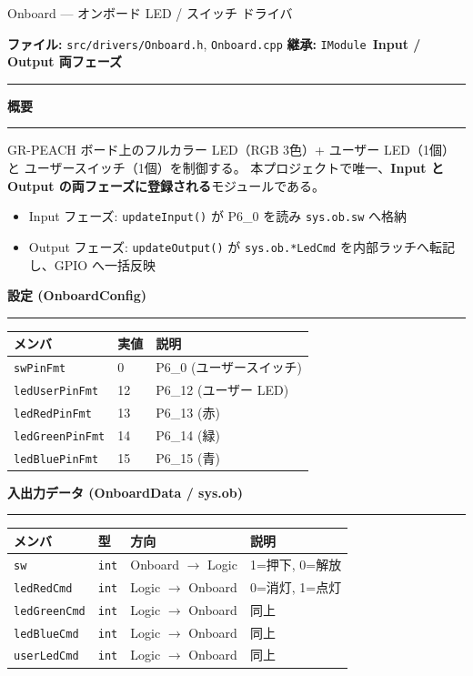 \documentclass[a4paper,11pt,dvipdfmx]{jsarticle}
\makeatletter
\newcommand{\apisection}[1]{%
  \par\addvspace{4mm}%
  {\normalsize\bfseries\color{headerblue} #1}%
  \par\vspace{-1mm}%
  {\color{accentblue!40}\rule{\linewidth}{0.5pt}}%
  \par\nobreak\vspace{2mm}%
  \@afterheading
}
\newcommand{\phasebadge}[1]{%
  \colorbox{accentblue!10}{\small\bfseries\color{accentblue!80!black}\,#1\,}%
}
\makeatother
\begin{document}
\begin{apibox}{Onboard --- オンボード LED / スイッチ ドライバ}

\textbf{ファイル:} \texttt{src/drivers/Onboard.h}, \texttt{Onboard.cpp} \hfill
\textbf{継承:} \texttt{IModule} \hfill
\phasebadge{Input / Output 両フェーズ}

\vspace{2mm}\hrule\vspace{2mm}

\apisection{概要}

GR-PEACH ボード上のフルカラー LED（RGB 3色）+ ユーザー LED（1個）と
ユーザースイッチ（1個）を制御する。
本プロジェクトで唯一、\textbf{Input と Output の両フェーズに登録される}モジュールである。

\begin{itemize}[nosep]
  \item Input フェーズ: \texttt{updateInput()} が P6\_0 を読み \texttt{sys.ob.sw} へ格納
  \item Output フェーズ: \texttt{updateOutput()} が \texttt{sys.ob.*LedCmd} を内部ラッチへ転記し、GPIO へ一括反映
\end{itemize}

\apisection{設定 (OnboardConfig)}

\begin{tabularx}{\textwidth}{l l X}
\toprule
\textbf{メンバ} & \textbf{実値} & \textbf{説明} \\
\midrule
\texttt{swPinFmt}       & 0  & P6\_0 (ユーザースイッチ) \\
\texttt{ledUserPinFmt}  & 12 & P6\_12 (ユーザー LED) \\
\texttt{ledRedPinFmt}   & 13 & P6\_13 (赤) \\
\texttt{ledGreenPinFmt} & 14 & P6\_14 (緑) \\
\texttt{ledBluePinFmt}  & 15 & P6\_15 (青) \\
\bottomrule
\end{tabularx}

\apisection{入出力データ (OnboardData / sys.ob)}

\begin{tabularx}{\textwidth}{l l l X}
\toprule
\textbf{メンバ} & \textbf{型} & \textbf{方向} & \textbf{説明} \\
\midrule
\texttt{sw}           & \texttt{int} & Onboard $\rightarrow$ Logic & 1=押下, 0=解放 \\
\texttt{ledRedCmd}    & \texttt{int} & Logic $\rightarrow$ Onboard & 0=消灯, 1=点灯 \\
\texttt{ledGreenCmd}  & \texttt{int} & Logic $\rightarrow$ Onboard & 同上 \\
\texttt{ledBlueCmd}   & \texttt{int} & Logic $\rightarrow$ Onboard & 同上 \\
\texttt{userLedCmd}   & \texttt{int} & Logic $\rightarrow$ Onboard & 同上 \\
\bottomrule
\end{tabularx}


\end{apibox}
\end{document}
